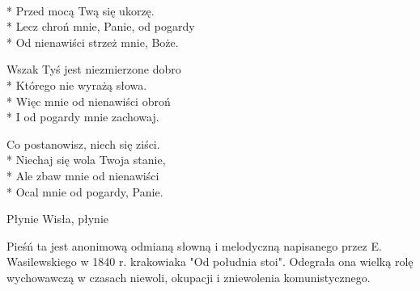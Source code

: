 \begin{lyrics}[longestline={Lecz chroń mnie, Panie, od pogardy}]

\\*
Przed mocą Twą się ukorzę.\\*
Lecz chroń mnie, Panie, od pogardy\\*
Od nienawiści strzeż mnie, Boże.

Wszak Tyś jest niezmierzone dobro\\*
Którego nie wyrażą słowa.\\*
Więc mnie od nienawiści obroń\\*
I od pogardy mnie zachowaj.

\begin{markverses}[atwidthof={Co postanowisz, niech się ziści.}]%
Co postanowisz, niech się ziści.\\*
Niechaj się wola Twoja stanie,\\*
Ale zbaw mnie od nienawiści\\*
Ocal mnie od pogardy, Panie.
\end{markverses}
\end{lyrics}



\song
{Płynie Wisła, płynie}
\begin{info}Pieśń ta jest anonimową odmianą słowną i melodyczną napisanego przez E. Wasilewskiego w 1840 r. krakowiaka "Od południa stoi". Odegrała ona wielką rolę wychowawczą w czasach niewoli, okupacji i zniewolenia komunistycznego.\end{info}

